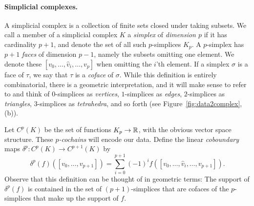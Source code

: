 \paragraph{Simplicial complexes.} 
A simplicial complex is a collection of finite sets closed under taking subsets.
We call a member of a simplicial complex $K$ a \emph{simplex} of \emph{dimension $p$} if it has cardinality $p+1$, and denote the set of all such $p$-simplices $K_p$.
A $p$-simplex has $p+1$ \emph{faces} of dimension $p-1$, namely the subsets omitting one element. We denote these $[v_0,\dotsc,\hat{v}_i,\dotsc, v_p]$ when omitting the $i$'th element.
If a simplex $\sigma$ is a face of $\tau$, we say that $\tau$ is a \emph{coface} of $\sigma$. While this definition is entirely combinatorial, there is a geometric interpretation, and it will make sense to refer to and think of $0$-simplices as \emph{vertices}, $1$-simplices as \emph{edges}, $2$-simplices as \emph{triangles}, $3$-simplices as \emph{tetrahedra}, and so forth (see Figure~\ref{fig:data2complex}, (b)).

Let $C^p(K)$ be the set of functions $K_p\to\mathbb{R}$, with the obvious vector space structure. These \emph{$p$-cochains} will encode our data. Define the linear \emph{coboundary} maps $\delta^p:C^p(K)\to C^{p+1}(K)$ by
\begin{equation*}
\delta^p(f)([v_0,\dotsc,v_{p+1}]) = \sum_{i=0}^{p+1} (-1)^i f([v_0,\dotsc,\hat{v}_i,\dotsc,v_{p+1}]).
\end{equation*}
Observe that this definition can be thought of in geometric terms: The support of $\delta^p(f)$ is contained in the set of $(p+1)$-simplices that are cofaces of the $p$-simplices that make up the support of $f$.

